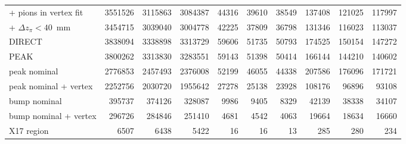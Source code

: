 \begin{table}[H]
\begin{tabular}{l rrr rrr rrr}
+ pions in vertex fit & 3551526 & 3115863 & 3084387 & 44316 & 39610 & 38549 & 137408 & 121025 & 117997 \\
+ $\Delta z_\pi<40$~mm & 3454715 & 3039040 & 3004778 & 42225 & 37809 & 36798 & 131346 & 116023 & 113037 \\
\midrule
DIRECT & 3838094 & 3338898 & 3313729 & 59606 & 51735 & 50793 & 174525 & 150154 & 147272 \\
PEAK & 3800262 & 3313830 & 3283551 & 59143 & 51398 & 50414 & 166144 & 144210 & 140602 \\
peak nominal & 2776853 & 2457493 & 2376008 & 52199 & 46055 & 44338 & 207586 & 176096 & 171721 \\
peak nominal + vertex & 2252756 & 2030720 & 1955642 & 27278 & 25138 & 23928 & 108176 & 96896 & 93108 \\
bump nominal & 395737 & 374126 & 328087 & 9986 & 9405 & 8329 & 42139 & 38338 & 34107 \\
bump nominal + vertex & 296726 & 284846 & 251410 & 4681 & 4542 & 4063 & 19664 & 18634 & 16660 \\
X17 region & 6507 & 6438 & 5422 & 16 & 16 & 13 & 285 & 280 & 234 \\
\bottomrule
\end{tabular}
\end{table}
